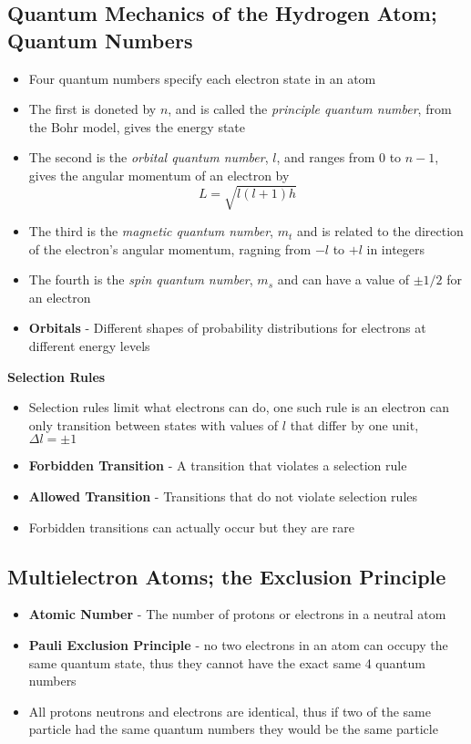 \subsection{Quantum Mechanics of the Hydrogen Atom; Quantum Numbers}
\begin{itemize}
    \item Four quantum numbers specify each electron state in an atom
    \item The first is doneted by \(n\), and is called the \emph{principle quantum number}, from the Bohr model, gives the energy state
    \item The second is the \emph{orbital quantum number}, \(l\), and ranges from 0 to \(n-1\), gives the angular momentum of an electron by \[L=\sqrt{l(l+1)h}\]
    \item The third is the \emph{magnetic quantum number}, \(m_t\) and is related to the direction of the electron's angular momentum, ragning from \(-l\) to \(+l\) in integers
    \item The fourth is the \emph{spin quantum number}, \(m_s\) and can have a value of \(\pm1/2\) for an electron
    \item \textbf{Orbitals} - Different shapes of probability distributions for electrons at different energy levels
\end{itemize}

\textbf{Selection Rules}
\begin{itemize}
    \item Selection rules limit what electrons can do, one such rule is an electron can only transition between states with values of \(l\) that differ by one unit, \(\Delta l=\pm1\)
    \item \textbf{Forbidden Transition} - A transition that violates a selection rule
    \item \textbf{Allowed Transition} - Transitions that do not violate selection rules
    \item Forbidden transitions can actually occur but they are rare
\end{itemize}

\subsection{Multielectron Atoms; the Exclusion Principle}
\begin{itemize}
    \item \textbf{Atomic Number} - The number of protons or electrons in a neutral atom
    \item \textbf{Pauli Exclusion Principle} - no two electrons in an atom can occupy the same quantum state, thus they cannot have the exact same 4 quantum numbers
    \item All protons neutrons and electrons are identical, thus if two of the same particle had the same quantum numbers they would be the same particle
\end{itemize}

